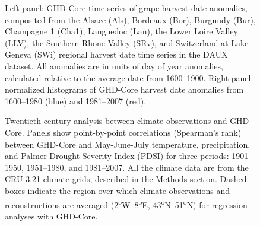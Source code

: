 \documentclass[final]{nature}
\begin{document}

\begin{figure}
\caption{Left panel: GHD-Core time series of grape harvest date anomalies, composited from the Alsace (Als), Bordeaux (Bor), Burgundy (Bur), Champagne 1 (Cha1), Languedoc (Lan), the Lower Loire Valley (LLV), the Southern Rhone Valley (SRv), and Switzerland at Lake Geneva (SWi) regional harvest date time series in the DAUX\cite{Daux2012} dataset. All anomalies are in units of day of year anomalies, calculated relative to the average date from 1600--1900. Right panel: normalized histograms of GHD-Core harvest date anomalies from 1600--1980 (blue) and 1981--2007 (red).}
\end{figure}

\begin{figure}
\caption{Twentieth century analysis between climate observations and GHD-Core. Panels show point-by-point correlations (Spearman's rank) between GHD-Core and May-June-July temperature, precipitation, and Palmer Drought Severity Index (PDSI) for three periods: 1901--1950, 1951--1980, and 1981--2007. All the climate data are from the CRU 3.21 climate grids, described in the Methods section. Dashed boxes indicate the region over which climate observations and reconstructions are averaged (2\textsuperscript{o}W--8\textsuperscript{o}E, 43\textsuperscript{o}N--51\textsuperscript{o}N) for regression analyses with GHD-Core.}
\end{figure}
\end{document}
